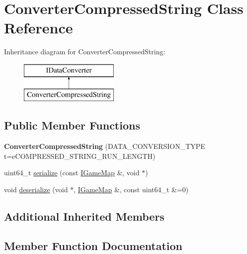 \hypertarget{class_converter_compressed_string}{}\section{Converter\+Compressed\+String Class Reference}
\label{class_converter_compressed_string}
Inheritance diagram for Converter\+Compressed\+String\+:\begin{figure}[H]
\begin{center}
\leavevmode
\includegraphics[height=2.000000cm]{class_converter_compressed_string}
\end{center}
\end{figure}
\subsection*{Public Member Functions}
\begin{DoxyCompactItemize}
\item 
\hypertarget{class_converter_compressed_string_a2ba349113b7776bb95be9277294fcbb8}{}{\bfseries Converter\+Compressed\+String} (D\+A\+T\+A\+\_\+\+C\+O\+N\+V\+E\+R\+S\+I\+O\+N\+\_\+\+T\+Y\+P\+E t=e\+C\+O\+M\+P\+R\+E\+S\+S\+E\+D\+\_\+\+S\+T\+R\+I\+N\+G\+\_\+\+R\+U\+N\+\_\+\+L\+E\+N\+G\+T\+H)\label{class_converter_compressed_string_a2ba349113b7776bb95be9277294fcbb8}

\item 
uint64\+\_\+t \hyperlink{class_converter_compressed_string_a1861bc41ee56acd3154fb7530dd0b42a}{serialize} (const \hyperlink{class_i_game_map}{I\+Game\+Map} \&, void $\ast$)
\item 
void \hyperlink{class_converter_compressed_string_a861bc2484dbf70ccc2f598e55f1ae0dd}{deserialize} (void $\ast$, \hyperlink{class_i_game_map}{I\+Game\+Map} \&, const uint64\+\_\+t \&=0)
\end{DoxyCompactItemize}
\subsection*{Additional Inherited Members}


\subsection{Member Function Documentation}
\hypertarget{class_converter_compressed_string_a861bc2484dbf70ccc2f598e55f1ae0dd}{}
